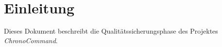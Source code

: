 \section{Einleitung}

Dieses Dokument beschreibt die Qualitätssicherungsphase des Projektes \emph{ChronoCommand}.